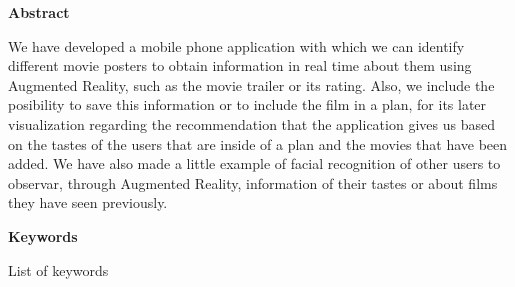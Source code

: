 
\newpage

\thispagestyle{empty}

\begin{center}

{\bf \Huge Abstract}

  \end{center}
\vspace{1cm}

We have developed a mobile phone application with which we can 
identify different movie posters to obtain information in real time about 
them using Augmented Reality, such as the movie trailer or its rating. Also,
we include the posibility to save this information or to include the film in a plan,
for its later visualization regarding the recommendation that the application gives us based
on the tastes of the users that are inside of a plan and the movies that have been 
added. We have also made a little example of facial recognition of other users to observar,
through Augmented Reality, information of their tastes or about films they have seen previously.

\vspace{1cm}


\begin{center}

{\bf \Large Keywords}

   \end{center}

   \vspace{0.5cm}
   
List of keywords
   


